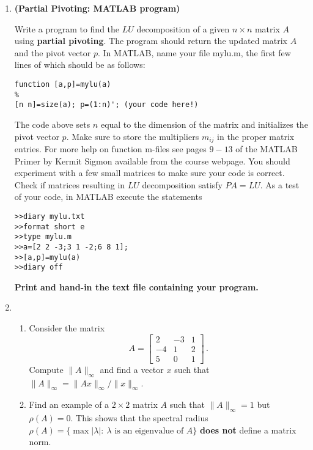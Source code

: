\documentclass [12pt]{article}
\begin{document}
\begin{enumerate}

\item \textbf{(Partial Pivoting: MATLAB program)}

Write a program to find the $LU$ decomposition of a given $n
\times n$ matrix $A$ using {\bf partial pivoting}. The program
should return the updated matrix $A$ and the pivot vector $p$. In MATLAB, name your file mylu.m, the first few lines
of which should be as follows:
\begin{verbatim}
function [a,p]=mylu(a)
%
[n n]=size(a); p=(1:n)'; (your code here!)
\end{verbatim}
The code above sets $n$ equal to the dimension of the matrix and
initializes the pivot vector $p$. Make sure to store the
multipliers $m_{ij}$ in the proper matrix entries.  For more help
on function m-files see pages $9-13$ of the MATLAB Primer    
by Kermit Sigmon
available from the course webpage. You should experiment with a
few small matrices to make sure your code is correct. Check if
matrices resulting in $LU$ decomposition satisfy $PA=LU$. As a
test of your code, in MATLAB execute the statements
\begin{verbatim}
>>diary mylu.txt
>>format short e
>>type mylu.m
>>a=[2 2 -3;3 1 -2;6 8 1];
>>[a,p]=mylu(a)
>>diary off
\end{verbatim}
{\bf Print and hand-in the text file containing your program.}


\item 
\begin{enumerate}

\item Consider the matrix
$$
A= \left[
   \begin{array}{rrr}
    2 & -3 & 1 \\
   -4 &  1 & 2 \\
    5 &  0 & 1
   \end{array} \right] \,.
$$
Compute $\|A\|_\infty$ and
find a vector $x$ such that
$\|A\|_\infty = \|Ax\|_\infty / \|x\|_\infty$.

\item Find an example of a $2 \times 2$ matrix $A$ such that
$\|A\|_\infty =1$ but $\rho (A)=0$. This shows that the spectral
radius $\rho (A)=\{\max{|\lambda|: \ \lambda \mbox{ is an
eigenvalue of } A}\}$ {\bf does not} define a matrix norm.

\end{enumerate}


\end{enumerate}
\end{document}
